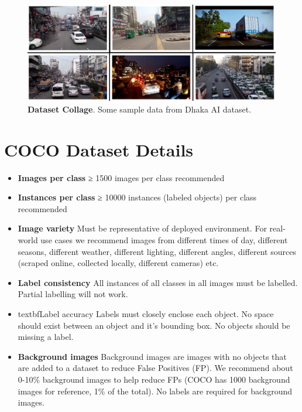 \begin{figure}[H] %
  \centering
  \includegraphics[width=\textwidth]{figures/paper/dataset-collage.jpg}
  \caption[Dataset Collage]{\textbf{Dataset Collage}. Some sample data from Dhaka AI dataset.}
  \label{fig:figures/paper/dataset-collage.jpg}
\end{figure}



\section{COCO Dataset Details}
\begin{itemize}
  \item \textbf{Images per class} ≥ 1500 images per class recommended
  \item \textbf{Instances per class} ≥ 10000 instances (labeled objects) per class recommended
  \item \textbf{Image variety} Must be representative of deployed environment. For real-world use cases we recommend images from different times of day, different seasons, different weather, different lighting, different angles, different sources (scraped online, collected locally, different cameras) etc.
 \item \textbf{Label consistency} All instances of all classes in all images must be labelled. Partial labelling will not work.
 \item textbf{Label accuracy} Labels must closely enclose each object. No space should exist between an object and it's bounding box. No objects should be missing a label.
 \item \textbf{Background images} Background images are images with no objects that are added to a dataset to reduce False Positives (FP). We recommend about 0-10\% background images to help reduce FPs (COCO has 1000 background images for reference, 1\% of the total). No labels are required for background images.
\end{itemize}


